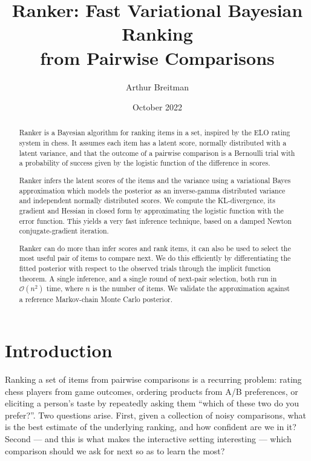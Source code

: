 \documentclass[12pt]{article}
\begin{document}
\title{Ranker: Fast Variational Bayesian Ranking\\from Pairwise Comparisons}
\author{Arthur Breitman}
\date{October 2022}
\maketitle
\begin{abstract}
    Ranker is a Bayesian algorithm for ranking items in a set, inspired by the ELO rating
    system in chess. It assumes each item has a latent score, normally distributed
    with a latent variance, and that the outcome of a pairwise comparison is a Bernoulli
    trial with a probability of success given by the logistic function of the difference
    in scores.

    Ranker infers the latent scores of the items and the variance using a variational
    Bayes approximation which models the posterior as an inverse-gamma distributed variance
    and independent normally distributed scores. We compute the KL-divergence, its gradient and
    Hessian in closed form by approximating the logistic function with the error function.
    This yields a very fast inference technique, based on a damped Newton conjugate-gradient
    iteration.

    Ranker can do more than infer scores and rank items, it can also be used to select the
    most useful pair of items to compare next. We do this efficiently by differentiating the
    fitted posterior with respect to the observed trials through the implicit function theorem.
    A single inference, and a single round of next-pair selection, both run in $\mathcal{O}(n^2)$
    time, where $n$ is the number of items. We validate the approximation against a reference
    Markov-chain Monte Carlo posterior.
\end{abstract}

\section{Introduction}
    Ranking a set of items from pairwise comparisons is a recurring problem: rating chess
    players from game outcomes, ordering products from A/B preferences, or eliciting a
    person's taste by repeatedly asking them ``which of these two do you prefer?''. Two
    questions arise. First, given a collection of noisy comparisons, what is the best estimate
    of the underlying ranking, and how confident are we in it? Second --- and this is what makes
    the interactive setting interesting --- which comparison should we ask for next so as to
    learn the most?
\end{document}
